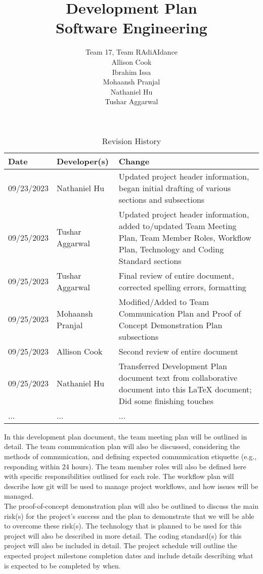 \documentclass{article}
\title{Development Plan\\Software Engineering}
\author{Team 17, Team RAdiAIdance\\Allison Cook\\Ibrahim Issa\\Mohaansh Pranjal\\Nathaniel Hu\\Tushar Aggarwal}
\date{}
\begin{document}
\maketitle

\begin{table}[hp]
\caption{Revision History} \label{TblRevisionHistory}
\begin{tabularx}{\textwidth}{llX}
\toprule
\textbf{Date} & \textbf{Developer(s)} & \textbf{Change}\\
\midrule
09/23/2023 & Nathaniel Hu & Updated project header information, began initial drafting of various sections and subsections \\
09/25/2023  & Tushar Aggarwal & Updated project header information, added to/updated Team Meeting Plan, Team Member Roles, Workflow Plan, Technology and Coding Standard sections \\
09/25/2023 & Tushar Aggarwal & Final review of entire document, corrected spelling errors, formatting \\
09/25/2023 & Mohaansh Pranjal & Modified/Added to Team Communication Plan and Proof of Concept Demonstration Plan subsections \\
09/25/2023 & Allison Cook & Second review of entire document \\
09/25/2023 & Nathaniel Hu & Transferred Development Plan document text from collaborative document into this LaTeX document; Did some finishing touches \\
... & ... & ...\\
\bottomrule
\end{tabularx}
\end{table}

\noindent In this development plan document, the team meeting plan will be outlined in detail. The team communication plan will also be discussed, considering the methods of communication, and defining expected communication etiquette (e.g., responding within 24 hours). The team member roles will also be defined here with specific responsibilities outlined for each role. The workflow plan will describe how git will be used to manage project workflows, and how issues will be managed. \\

\noindent The proof-of-concept demonstration plan will also be outlined to discuss the main risk(s) for the project’s success and the plan to demonstrate that we will be able to overcome these risk(s). The technology that is planned to be used for this project will also be described in more detail. The coding standard(s) for this project will also be included in detail. The project schedule will outline the expected project milestone completion dates and include details describing what is expected to be completed by when.
\end{document}
